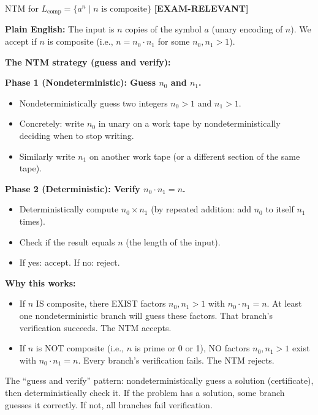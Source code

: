 \documentclass[11pt,a4paper]{article}
\newcommand{\kemark}{\textcolor{red!70!black}{\textbf{[EXAM-RELEVANT]}}}
\newcommand{\kt}[1]{\par\vspace{0.3em}\colorbox{yellow!60}{\parbox{\dimexpr\linewidth-2\fboxsep}{#1}}\vspace{0.3em}}
\begin{document}
\begin{definitionbox}{{NTM for $L_{\text{comp}} = \{a^n \mid n \text{ is composite}\}$} \kemark}

\textbf{Plain English:}
The input is $n$ copies of the symbol $a$ (unary encoding of $n$). We accept if $n$ is composite (i.e., $n = n_0 \cdot n_1$ for some $n_0, n_1 > 1$).

\textbf{The NTM strategy (guess and verify):}

\textbf{Phase 1 (Nondeterministic): Guess $n_0$ and $n_1$.}
\begin{itemize}[nosep]
\item Nondeterministically guess two integers $n_0 > 1$ and $n_1 > 1$.
\item Concretely: write $n_0$ in unary on a work tape by nondeterministically deciding when to stop writing.
\item Similarly write $n_1$ on another work tape (or a different section of the same tape).
\end{itemize}

\textbf{Phase 2 (Deterministic): Verify $n_0 \cdot n_1 = n$.}
\begin{itemize}[nosep]
\item Deterministically compute $n_0 \times n_1$ (by repeated addition: add $n_0$ to itself $n_1$ times).
\item Check if the result equals $n$ (the length of the input).
\item If yes: accept. If no: reject.
\end{itemize}

\textbf{Why this works:}
\begin{itemize}[nosep]
\item If $n$ IS composite, there EXIST factors $n_0, n_1 > 1$ with $n_0 \cdot n_1 = n$. At least one nondeterministic branch will guess these factors. That branch's verification succeeds. The NTM accepts.
\item If $n$ is NOT composite (i.e., $n$ is prime or 0 or 1), NO factors $n_0, n_1 > 1$ exist with $n_0 \cdot n_1 = n$. Every branch's verification fails. The NTM rejects.
\end{itemize}

\kt{The ``guess and verify'' pattern: nondeterministically guess a solution (certificate), then deterministically check it. If the problem has a solution, some branch guesses it correctly. If not, all branches fail verification.}
\end{definitionbox}
\end{document}
